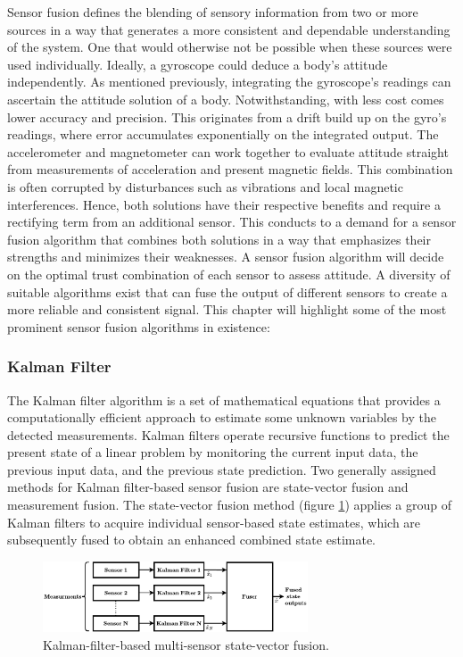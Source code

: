 Sensor fusion defines the blending of sensory information from two or more sources in a way that generates a more consistent and dependable understanding of the system. One that would otherwise not be possible when these sources were used individually. Ideally, a gyroscope could deduce a body's attitude independently. As mentioned previously, integrating the gyroscope's readings can ascertain the attitude solution of a body. Notwithstanding, with less cost comes lower accuracy and precision. This originates from a drift build up on the gyro's readings, where error accumulates exponentially on the integrated output. The accelerometer and magnetometer can work together to evaluate attitude straight from measurements of acceleration and present magnetic fields. This combination is often corrupted by disturbances such as vibrations and local magnetic interferences. Hence, both solutions have their respective benefits and require a rectifying term from an additional sensor. This conducts to a demand for a sensor fusion algorithm that combines both solutions in a way that emphasizes their strengths and minimizes their weaknesses. A sensor fusion algorithm will decide on the optimal trust combination of each sensor to assess attitude. A diversity of suitable algorithms exist that can fuse the output of different sensors to create a more reliable and consistent signal. This chapter will highlight some of the most prominent sensor fusion algorithms in existence:

\subsubsection{Kalman Filter}

The Kalman filter algorithm is a set of mathematical equations that provides a computationally efficient approach to estimate some unknown variables by the detected measurements\cite{welch1995introduction}. Kalman filters operate recursive functions to predict the present state of a linear problem by monitoring the current input data, the previous input data, and the previous state prediction. Two generally assigned methods for Kalman filter-based sensor fusion are state-vector fusion and measurement fusion. The state-vector fusion method (figure \ref{fig:state_kalman}) applies a group of Kalman filters to acquire individual sensor-based state estimates, which are subsequently fused to obtain an enhanced combined state estimate.

\begin{figure}[!h]
    \centering
    \includegraphics[width=0.7\textwidth]{figures/kalman1.pdf}
    \caption{Kalman-filter-based multi-sensor state-vector fusion. \cite{mosallaei2007process}}
    \label{fig:state_kalman}
\end{figure}


